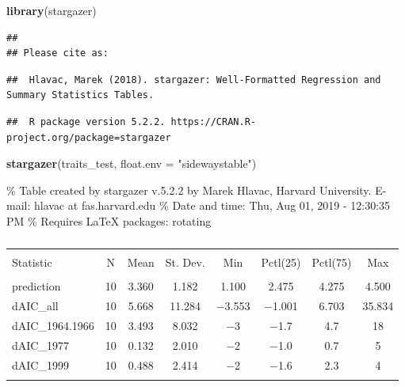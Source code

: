 \documentclass[]{article}
\newenvironment{Shaded}{\begin{snugshade}}{\end{snugshade}}
\newcommand{\DataTypeTok}[1]{\textcolor[rgb]{0.13,0.29,0.53}{#1}}
\newcommand{\KeywordTok}[1]{\textcolor[rgb]{0.13,0.29,0.53}{\textbf{#1}}}
\newcommand{\NormalTok}[1]{#1}
\newcommand{\StringTok}[1]{\textcolor[rgb]{0.31,0.60,0.02}{#1}}
\begin{document}
\begin{Shaded}
\begin{Highlighting}[]
\KeywordTok{library}\NormalTok{(stargazer)}
\end{Highlighting}
\end{Shaded}

\begin{verbatim}
## 
## Please cite as:
\end{verbatim}

\begin{verbatim}
##  Hlavac, Marek (2018). stargazer: Well-Formatted Regression and Summary Statistics Tables.
\end{verbatim}

\begin{verbatim}
##  R package version 5.2.2. https://CRAN.R-project.org/package=stargazer
\end{verbatim}

\begin{Shaded}
\begin{Highlighting}[]
\KeywordTok{stargazer}\NormalTok{(traits_test, }
          \DataTypeTok{float.env =} \StringTok{"sidewaystable"}\NormalTok{)}
\end{Highlighting}
\end{Shaded}

\% Table created by stargazer v.5.2.2 by Marek Hlavac, Harvard
University. E-mail: hlavac at fas.harvard.edu \% Date and time: Thu, Aug
01, 2019 - 12:30:35 PM \% Requires LaTeX packages: rotating

\begin{table} \centering 
  \caption{} 
  \label{} 
\begin{tabular}{@{\extracolsep{5pt}}lccccccc} 
\\[-1.8ex]\hline 
\hline \\[-1.8ex] 
Statistic & \multicolumn{1}{c}{N} & \multicolumn{1}{c}{Mean} & \multicolumn{1}{c}{St. Dev.} & \multicolumn{1}{c}{Min} & \multicolumn{1}{c}{Pctl(25)} & \multicolumn{1}{c}{Pctl(75)} & \multicolumn{1}{c}{Max} \\ 
\hline \\[-1.8ex] 
prediction & 10 & 3.360 & 1.182 & 1.100 & 2.475 & 4.275 & 4.500 \\ 
dAIC\_all & 10 & 5.668 & 11.284 & $-$3.553 & $-$1.001 & 6.703 & 35.834 \\ 
dAIC\_1964.1966 & 10 & 3.493 & 8.032 & $-$3 & $-$1.7 & 4.7 & 18 \\ 
dAIC\_1977 & 10 & 0.132 & 2.010 & $-$2 & $-$1.0 & 0.7 & 5 \\ 
dAIC\_1999 & 10 & 0.488 & 2.414 & $-$2 & $-$1.6 & 2.3 & 4 \\ 
\hline \\[-1.8ex] 
\end{tabular} 
\end{table}
\end{document}

